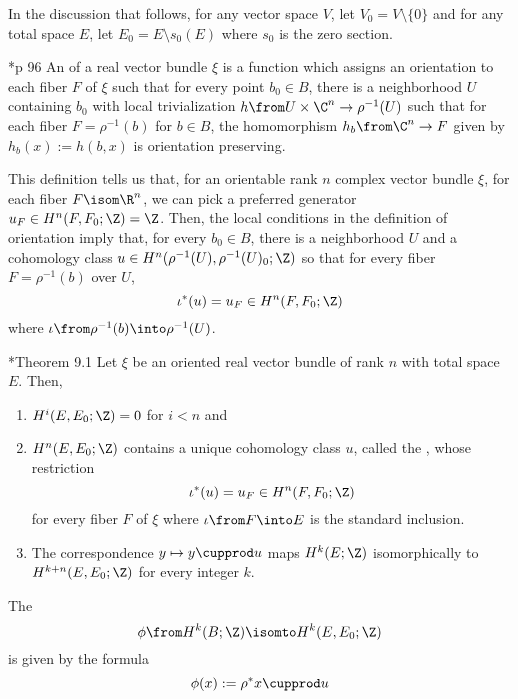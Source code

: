 \documentclass[11pt,leqno,oneside]{amsbook}
\numberwithin{thm}{section}
\begin{document}
\begin{defn}
  In the discussion that follows, for any vector space \(V\), let
  \(V_0 = V \setminus \{0\}\) and for any total space \(E\), let \(E_0
  = E \setminus s_0(E)\) where \(s_0\) is the zero section.
\end{defn}
\begin{defn}
  \cite{milnor-stasheff}*{p 96} An  of a real vector
  bundle 
  \(\xi\) is a function which assigns an orientation to each fiber
  \(F\) of \(\xi\) such that for every point \(b_0 \in B\), there is a
  neighborhood \(U\) containing \(b_0\) with local
  trivialization \(h \from U \times \C^n \to \rho^{-1}(U)\) such that
  for each fiber \(F = \rho^{-1}(b)\) for \(b \in B\), the
  homomorphism \(h_b \from \C^n \to F\) given by \(h_b(x) := h(b,x)\)
  is orientation preserving. 
\end{defn}
This definition tells us that, for an orientable rank \(n\) complex
vector bundle \(\xi\), for each fiber \(F \isom \R^n\), we can pick a
preferred generator \(u_F \in H^n(F,F_0;\Z) = \Z\). Then, the local
conditions in the definition of orientation imply that, for every
\(b_0 \in B\), there is a neighborhood \(U\) and a cohomology class
\(u \in H^n(\rho^{-1}(U), \rho^{-1}(U)_0;\Z)\) so that for every fiber
\(F = \rho^{-1}(b)\) over \(U\), \[
  \iota^*(u) = u_F \in H^n(F,F_0;\Z)
\]
where \(\iota \from \rho^{-1}(b) \into \rho^{-1}(U)\).
\begin{thm}
  \cite{milnor-stasheff}*{Theorem 9.1} Let \(\xi\) be an oriented
  real vector bundle of rank \(n\) with total space \(E\). Then,
  \begin{enumerate}
  \item \(H^i(E,E_0;\Z) = 0\) for \(i < n\) and
  \item \(H^n(E,E_0;\Z)\) contains a unique cohomology class \(u\),
    called the , 
    whose restriction \[
      \iota^*(u) = u_F \in H^n(F,F_0;\Z)
    \]
    for every fiber \(F\) of \(\xi\) where \(\iota \from F \into E\)
    is the standard inclusion.
  \item The correspondence \(y \mapsto y \cupprod u\) maps
    \(H^k(E;\Z)\) isomorphically to \(H^{k+n}(E,E_0;\Z)\) for every
    integer \(k\).
  \end{enumerate}
\end{thm}
\begin{defn}
  The  \[
    \phi \from H^k(B;\Z) \isomto H^k(E,E_0;\Z)
  \]
  is given by the formula \[
    \phi(x) := \rho^* x \cupprod u
  \]
\end{defn}
\end{document}
